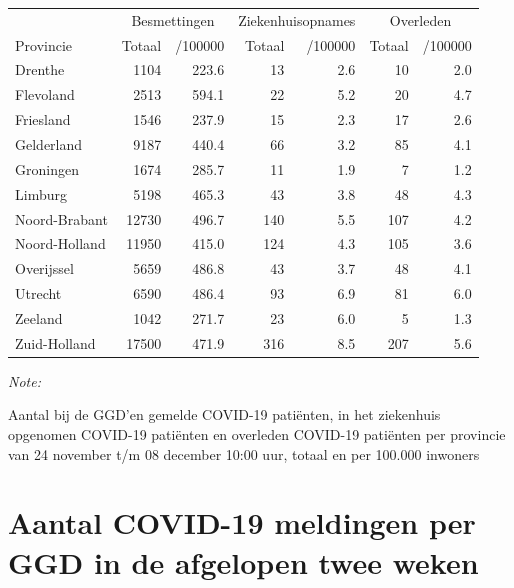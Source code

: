 \documentclass[
  english,
  man,floatsintext]{apa6}
\begin{document}
\begin{table}[H]
\centering
\begin{threeparttable}
\begin{tabular}{lrrrrrr}
\toprule
\multicolumn{1}{c}{ } & \multicolumn{2}{c}{Besmettingen} & \multicolumn{2}{c}{Ziekenhuisopnames} & \multicolumn{2}{c}{Overleden} \\
\cmidrule(l{3pt}r{3pt}){2-3} \cmidrule(l{3pt}r{3pt}){4-5} \cmidrule(l{3pt}r{3pt}){6-7}
Provincie & Totaal & /100000 & Totaal & /100000 & Totaal & /100000\\
\midrule
Drenthe & 1104 & 223.6 & 13 & 2.6 & 10 & 2.0\\
Flevoland & 2513 & 594.1 & 22 & 5.2 & 20 & 4.7\\
Friesland & 1546 & 237.9 & 15 & 2.3 & 17 & 2.6\\
Gelderland & 9187 & 440.4 & 66 & 3.2 & 85 & 4.1\\
Groningen & 1674 & 285.7 & 11 & 1.9 & 7 & 1.2\\
Limburg & 5198 & 465.3 & 43 & 3.8 & 48 & 4.3\\
Noord-Brabant & 12730 & 496.7 & 140 & 5.5 & 107 & 4.2\\
Noord-Holland & 11950 & 415.0 & 124 & 4.3 & 105 & 3.6\\
Overijssel & 5659 & 486.8 & 43 & 3.7 & 48 & 4.1\\
Utrecht & 6590 & 486.4 & 93 & 6.9 & 81 & 6.0\\
Zeeland & 1042 & 271.7 & 23 & 6.0 & 5 & 1.3\\
Zuid-Holland & 17500 & 471.9 & 316 & 8.5 & 207 & 5.6\\
\bottomrule
\end{tabular}
\begin{tablenotes}
\item \textit{Note: } 
\item Aantal bij de GGD’en gemelde COVID-19 patiënten, in het ziekenhuis opgenomen COVID-19 patiënten en overleden COVID-19 patiënten per provincie van 24 november t/m 08 december 10:00 uur, totaal en per 100.000 inwoners
\end{tablenotes}
\end{threeparttable}
\end{table}

\newpage

\hypertarget{aantal-covid-19-meldingen-per-ggd-in-de-afgelopen-twee-weken}{%
\section{Aantal COVID-19 meldingen per GGD in de afgelopen twee weken}\label{aantal-covid-19-meldingen-per-ggd-in-de-afgelopen-twee-weken}}
\end{document}
